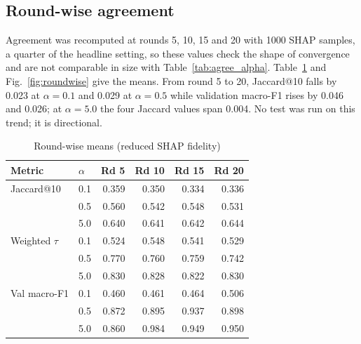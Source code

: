 \subsection{Round-wise agreement}
Agreement was recomputed at rounds 5, 10, 15 and 20 with 1000 SHAP samples, a quarter %
of the headline setting, so these values check the shape of convergence and are not
comparable in size with Table~\ref{tab:agree_alpha}. Table~\ref{tab:roundwise} and
Fig.~\ref{fig:roundwise} give the means. From round 5 to 20, Jaccard@10 falls by 0.023 %
at $\alpha=0.1$ and 0.029 at $\alpha=0.5$ while validation macro-F1 rises by 0.046 and %
0.026; at $\alpha=5.0$ the four Jaccard values span 0.004. No test was run on this %
trend; it is directional.

\begin{table}[h]
\centering
\caption{Round-wise means (reduced SHAP fidelity)}
\label{tab:roundwise}
\footnotesize
\setlength{\tabcolsep}{4pt}
\begin{tabular}{@{}llrrrr@{}}
\toprule
Metric & $\alpha$ & Rd 5 & Rd 10 & Rd 15 & Rd 20\\ %
\midrule
Jaccard@10 & 0.1 & 0.359 & 0.350 & 0.334 & 0.336\\ %
 & 0.5 & 0.560 & 0.542 & 0.548 & 0.531\\ %
 & 5.0 & 0.640 & 0.641 & 0.642 & 0.644\\ %
Weighted $\tau$ & 0.1 & 0.524 & 0.548 & 0.541 & 0.529\\ %
 & 0.5 & 0.770 & 0.760 & 0.759 & 0.742\\ %
 & 5.0 & 0.830 & 0.828 & 0.822 & 0.830\\ %
Val macro-F1 & 0.1 & 0.460 & 0.461 & 0.464 & 0.506\\ %
 & 0.5 & 0.872 & 0.895 & 0.937 & 0.898\\ %
 & 5.0 & 0.860 & 0.984 & 0.949 & 0.950\\ %
\bottomrule
\end{tabular}
\end{table}

